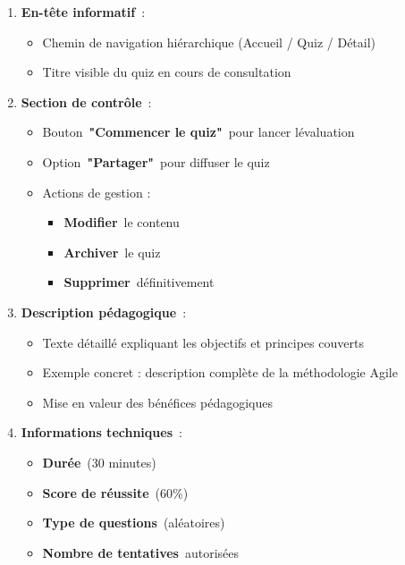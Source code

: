 \documentclass[12pt,a4paper,twoside,openright]{report}
\begin{document}
\begin{enumerate}
\def\labelenumi{\arabic{enumi}.}
\item
  \textbf{En-tête informatif}~:

  \begin{itemize}
  \item
    Chemin de navigation hiérarchique (Accueil / Quiz / Détail)
  \item
    Titre visible du quiz en cours de consultation
  \end{itemize}
\item
  \textbf{Section de contrôle}~:

  \begin{itemize}
  \item
    Bouton~\textbf{"Commencer le quiz"}~pour lancer
    l\textquotesingle évaluation
  \item
    Option~\textbf{"Partager"}~pour diffuser le quiz
  \item
    Actions de gestion :

    \begin{itemize}
    \item
      \textbf{Modifier}~le contenu
    \item
      \textbf{Archiver}~le quiz
    \item
      \textbf{Supprimer}~définitivement
    \end{itemize}
  \end{itemize}
\item
  \textbf{Description pédagogique}~:

  \begin{itemize}
  \item
    Texte détaillé expliquant les objectifs et principes couverts
  \item
    Exemple concret : description complète de la méthodologie Agile
  \item
    Mise en valeur des bénéfices pédagogiques
  \end{itemize}
\item
  \textbf{Informations techniques}~:

  \begin{itemize}
  \item
    \textbf{Durée}~(30 minutes)
  \item
    \textbf{Score de réussite}~(60\%)
  \item
    \textbf{Type de questions}~(aléatoires)
  \item
    \textbf{Nombre de tentatives}~autorisées
  \end{itemize}
\end{enumerate}
\end{document}
